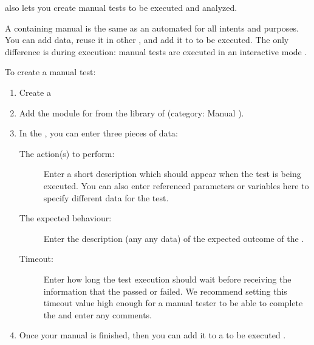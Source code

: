 \app{} also lets you create manual tests to be executed and analyzed.

A \gdcase{} containing manual \gdsteps{} is the same as an automated \gdcase{} for all intents and purposes. You can add data, reuse it in other \gdcases{}, and add it to \gdsuites{} to be executed. The only difference is during execution: manual tests are executed in an interactive mode . 

To create a manual test:
\begin{enumerate}
\item Create a \gdcase{} 
\item Add the module for  from the library of \gdcases{} (category: Manual \gdstep{}).
\item In the \gdpropview{}, you can enter three pieces of data:
\begin{description}
\item[The action(s) to perform:]{Enter a short description which should appear when the test is being executed. You can also enter referenced parameters   or variables  here to specify different data for the test.}
\item [The expected behaviour:]{Enter the description (any any data) of the expected outcome of the \gdstep{}.}
\item [Timeout:]{Enter how long the test execution should wait before receiving the information that the \gdstep{} passed or failed. We recommend setting this timeout value high enough for a manual tester to be able to complete the \gdstep{} and enter any comments.}
\end{description}
\item Once your manual \gdcase{} is finished, then you can add it to a \gdsuite{}  to be executed .
\end{enumerate}

